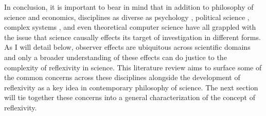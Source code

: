 

In conclusion, it is important to bear in mind that in addition to philosophy of science and economics, disciplines as diverse as psychology \autocite{luce95}, political science \autocite{rothschild2014,westwood2020}, complex systems \autocite{beinhocker2013}, and even theoretical computer science \autocite{hardt2016,perdomo2020} have all grappled with the issue that science causally effects its target of investigation in different forms. As I will detail below, observer effects are ubiquitous across scientific domains and only a broader understanding of these effects can do justice to the complexity of reflexivity in science. This literature review aims to surface some of the common concerns across these disciplines alongside the development of reflexivity as a key idea in contemporary philosophy of science. The next section will tie together these concerns into a general characterization of the concept of reflexivity.








